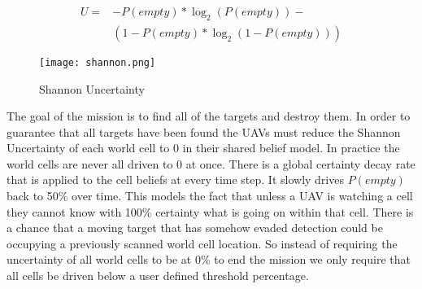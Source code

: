 \begin{equation}
\label{eq:shannon}
\begin{aligned}
U = &-P(empty) * \log_{2}(P(empty)) - \\&( 1-P(empty) * \log_{2}(1-P(empty)))
\end{aligned}
\end{equation}


\begin{figure}[H]
	\centering
	\texttt{[image: shannon.png]}
	\caption{Shannon Uncertainty}
	\label{fig:shannon}
\end{figure}






The goal of the mission is to find all of the targets and destroy them.  In order to guarantee that all targets have been found the UAVs must reduce the Shannon Uncertainty of each world cell to 0 in their shared belief model.  In practice the world cells are never all driven to 0 at once.  There is a global certainty decay rate that is applied to the cell beliefs at every time step.  It slowly drives $P(empty)$ back to 50\% over time.  This models the fact that unless a UAV is watching a cell they cannot know with 100\% certainty what is going on within that cell.  There is a chance that a moving target that has somehow evaded detection could be occupying a previously scanned world cell location.  So instead of requiring the uncertainty of all world cells to be at 0\% to end the mission we only require that all cells be driven below a user defined threshold percentage.

